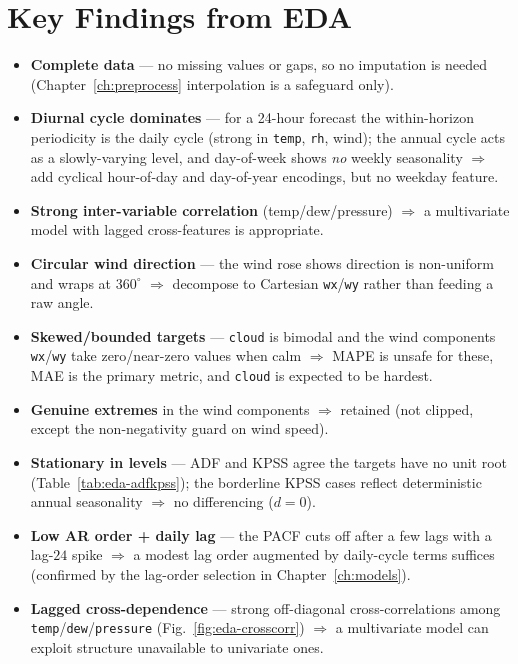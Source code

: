 \documentclass[12pt,a4paper,oneside]{report}
\begin{document}
\section{Key Findings from EDA}
\begin{itemize}
  \item \textbf{Complete data} --- no missing values or gaps, so no imputation is
        needed (Chapter~\ref{ch:preprocess} interpolation is a safeguard only).
  \item \textbf{Diurnal cycle dominates} --- for a 24-hour forecast the
        within-horizon periodicity is the daily cycle (strong in \texttt{temp},
        \texttt{rh}, wind); the annual cycle acts as a slowly-varying level, and
        day-of-week shows \emph{no} weekly seasonality $\Rightarrow$ add cyclical
        hour-of-day and day-of-year encodings, but no weekday feature.
  \item \textbf{Strong inter-variable correlation} (temp/dew/pressure)
        $\Rightarrow$ a multivariate model with lagged cross-features is
        appropriate.
  \item \textbf{Circular wind direction} --- the wind rose shows direction is
        non-uniform and wraps at $360^\circ$ $\Rightarrow$ decompose to Cartesian
        \texttt{wx}/\texttt{wy} rather than feeding a raw angle.
  \item \textbf{Skewed/bounded targets} --- \texttt{cloud} is bimodal and the wind
        components \texttt{wx}/\texttt{wy} take zero/near-zero values when calm
        $\Rightarrow$ MAPE is unsafe for these, MAE is the primary metric, and
        \texttt{cloud} is expected to be hardest.
  \item \textbf{Genuine extremes} in the wind components $\Rightarrow$ retained
        (not clipped, except the non-negativity guard on wind speed).
  \item \textbf{Stationary in levels} --- ADF and KPSS agree the targets have no
        unit root (Table~\ref{tab:eda-adfkpss}); the borderline KPSS cases reflect
        deterministic annual seasonality $\Rightarrow$ no differencing ($d=0$).
  \item \textbf{Low AR order + daily lag} --- the PACF cuts off after a few lags with
        a lag-$24$ spike $\Rightarrow$ a modest lag order augmented by daily-cycle
        terms suffices (confirmed by the lag-order selection in Chapter~\ref{ch:models}).
  \item \textbf{Lagged cross-dependence} --- strong off-diagonal cross-correlations
        among \texttt{temp}/\texttt{dew}/\texttt{pressure}
        (Fig.~\ref{fig:eda-crosscorr}) $\Rightarrow$ a multivariate model can exploit
        structure unavailable to univariate ones.
\end{itemize}
\end{document}
